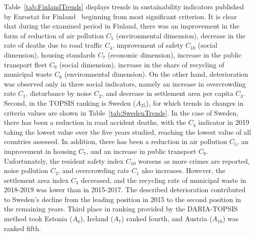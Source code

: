 \documentclass[5p,times]{elsarticle}
\begin{document}
Table~\ref{tab:FinlandTrends} displays trends in sustainability indicators published by Eurostat for Finland~\cite{eurostat2021, brochureEurostat2021, SDGandME2021} beginning from most significant criterion. It is clear that during the examined period in Finland, there was an improvement in the form of reduction of air pollution $C_{5}$ (environmental dimension), decrease in the rate of deaths due to road traffic $C_{4}$, improvement of safety $C_{10}$ (social dimension), housing standards $C_{7}$ (economic dimension), increase in the public transport fleet $C_{9}$ (social dimension), increase in the share of recycling of municipal waste $C_{6}$ (environmental dimension). On the other hand, deterioration was observed only in three social indicators, namely an increase in overcrowding rate $C_{1}$, disturbance by noise $C_{2}$, and decrease in settlement area per capita $C_{3}$. Second, in the TOPSIS ranking is Sweden ($A_{25}$), for which trends in changes in criteria values are shown in Table~\ref{tab:SwedenTrends}. In the case of Sweden, there has been a reduction in road accident deaths, with the $C_{4}$ indicator in 2019 taking the lowest value over the five years studied, reaching the lowest value of all countries assessed. In addition, there has been a reduction in air pollution $C_{5}$, an improvement in housing $C_{7}$, and an increase in public transport $C_{9}$. Unfortunately, the resident safety index $C_{10}$ worsens as more crimes are reported, noise pollution $C_{2}$, and overcrowding rate $C_{1}$ also increases. However, the settlement area index $C_{3}$ decreased, and the recycling rate of municipal waste in 2018-2019 was lower than in 2015-2017. The described deterioration contributed to Sweden's decline from the leading position in 2015 to the second position in the remaining years.
Third place in ranking provided by the DARIA-TOPSIS method took Estonia ($A_{6}$), Ireland ($A_{7}$) ranked fourth, and Austria ($A_{18}$) was ranked fifth. 
\end{document}
